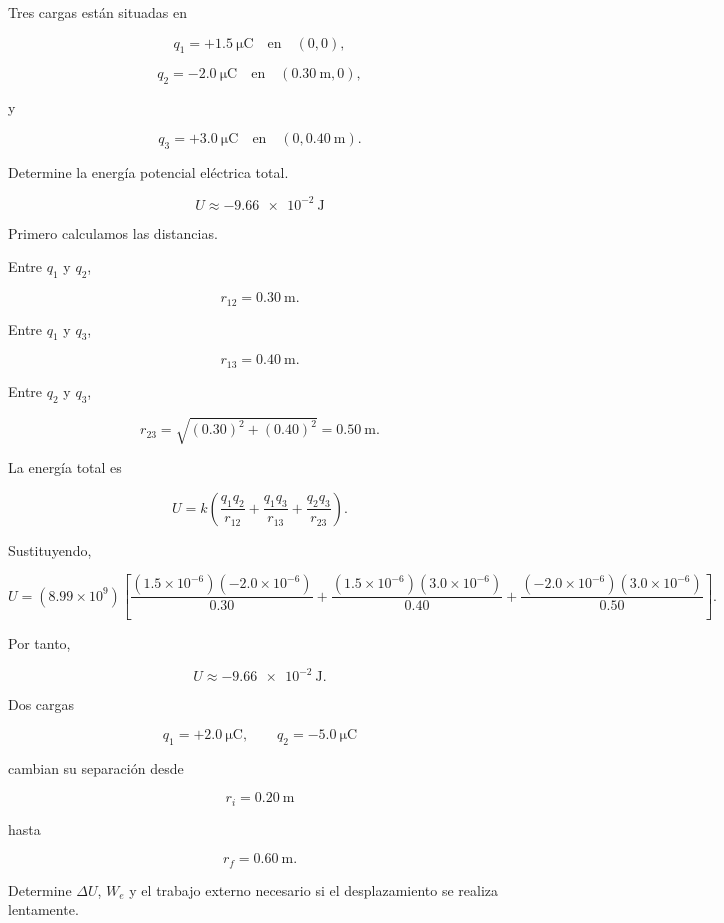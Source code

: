 \begin{ejercicio}

Tres cargas están situadas en

\[
q_1=+\SI{1.5}{\micro\coulomb}
\quad\text{en}\quad
(0,0),
\]

\[
q_2=-\SI{2.0}{\micro\coulomb}
\quad\text{en}\quad
(\SI{0.30}{\metre},0),
\]

y

\[
q_3=+\SI{3.0}{\micro\coulomb}
\quad\text{en}\quad
(0,\SI{0.40}{\metre}).
\]

Determine la energía potencial eléctrica total.

\end{ejercicio}

\begin{respuesta}

\[
\boxed{U\approx-\SI{9.66e-2}{\joule}}
\]

\end{respuesta}

\begin{explicacion}

Primero calculamos las distancias.

Entre \(q_1\) y \(q_2\),

\[
r_{12}=\SI{0.30}{\metre}.
\]

Entre \(q_1\) y \(q_3\),

\[
r_{13}=\SI{0.40}{\metre}.
\]

Entre \(q_2\) y \(q_3\),

\[
r_{23}
=
\sqrt{(0.30)^2+(0.40)^2}
=
\SI{0.50}{\metre}.
\]

La energía total es

\[
U
=
k
\left(
\frac{q_1q_2}{r_{12}}
+
\frac{q_1q_3}{r_{13}}
+
\frac{q_2q_3}{r_{23}}
\right).
\]

Sustituyendo,

\[
U
=
(8.99\times10^9)
\left[
\frac{(1.5\times10^{-6})(-2.0\times10^{-6})}{0.30}
+
\frac{(1.5\times10^{-6})(3.0\times10^{-6})}{0.40}
+
\frac{(-2.0\times10^{-6})(3.0\times10^{-6})}{0.50}
\right].
\]

Por tanto,

\[
\boxed{U\approx-\SI{9.66e-2}{\joule}}.
\]

\end{explicacion}


\begin{ejercicio}

Dos cargas

\[
q_1=+\SI{2.0}{\micro\coulomb},
\qquad
q_2=-\SI{5.0}{\micro\coulomb}
\]

cambian su separación desde

\[
r_i=\SI{0.20}{\metre}
\]

hasta

\[
r_f=\SI{0.60}{\metre}.
\]

Determine \(\Delta U\), \(W_e\) y el trabajo externo necesario si el desplazamiento
se realiza lentamente.

\end{ejercicio}


